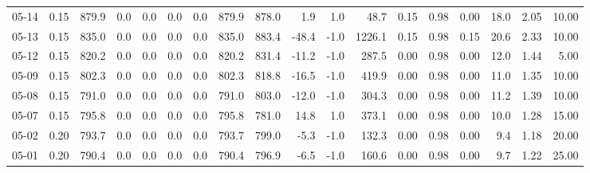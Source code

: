 \begin{threeparttable}
{\begin{tabular}{lrrrrrrrrrrrrrrrrr}
  05-14 &     0.15 & 879.9 &               0.0 &               0.0 &                0.0 &                0.0 & 879.9 & 878.0 &        1.9 &                      1.0 &                48.7 &       0.15 &      0.98 &           0.00 &             18.0 &            2.05 &                  10.00 \\
  05-13 &     0.15 & 835.0 &               0.0 &               0.0 &                0.0 &                0.0 & 835.0 & 883.4 &      -48.4 &                     -1.0 &              1226.1 &       0.15 &      0.98 &           0.15 &             20.6 &            2.33 &                  10.00 \\
  05-12 &     0.15 & 820.2 &               0.0 &               0.0 &                0.0 &                0.0 & 820.2 & 831.4 &      -11.2 &                     -1.0 &               287.5 &       0.00 &      0.98 &           0.00 &             12.0 &            1.44 &                   5.00 \\
  05-09 &     0.15 & 802.3 &               0.0 &               0.0 &                0.0 &                0.0 & 802.3 & 818.8 &      -16.5 &                     -1.0 &               419.9 &       0.00 &      0.98 &           0.00 &             11.0 &            1.35 &                  10.00 \\
  05-08 &     0.15 & 791.0 &               0.0 &               0.0 &                0.0 &                0.0 & 791.0 & 803.0 &      -12.0 &                     -1.0 &               304.3 &       0.00 &      0.98 &           0.00 &             11.2 &            1.39 &                  10.00 \\
  05-07 &     0.15 & 795.8 &               0.0 &               0.0 &                0.0 &                0.0 & 795.8 & 781.0 &       14.8 &                      1.0 &               373.1 &       0.00 &      0.98 &           0.00 &             10.0 &            1.28 &                  15.00 \\
  05-02 &     0.20 & 793.7 &               0.0 &               0.0 &                0.0 &                0.0 & 793.7 & 799.0 &       -5.3 &                     -1.0 &               132.3 &       0.00 &      0.98 &           0.00 &              9.4 &            1.18 &                  20.00 \\
  05-01 &     0.20 & 790.4 &               0.0 &               0.0 &                0.0 &                0.0 & 790.4 & 796.9 &       -6.5 &                     -1.0 &               160.6 &       0.00 &      0.98 &           0.00 &              9.7 &            1.22 &                  25.00 \\

\end{tabular}}
\end{threeparttable}
